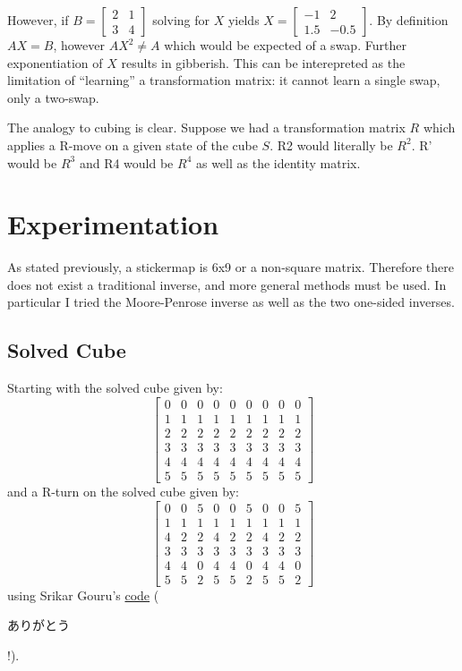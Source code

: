 \documentclass[11pt, oneside]{article}
\begin{document}
However, if \( B = \begin{bmatrix} 2 & 1 \\ 3 & 4 \end{bmatrix} \) solving for \( X \) yields \( X = \begin{bmatrix} -1 & 2 \\ 1.5 & -0.5 \end{bmatrix} \).
By definition \( A X = B \), however \( A X^2 \neq A \) which would be expected of a swap. Further exponentiation of \( X \) results in gibberish.
This can be interepreted as the limitation of ``learning'' a transformation matrix: it cannot learn a single swap, only a two-swap.

The analogy to cubing is clear. Suppose we had a transformation matrix \( R \) which applies a R-move on a given state of the cube \( S \). R2 would literally be \( R^2 \).
R' would be \( R^3 \) and R4 would be \( R^4 \) as well as the identity matrix.

\section{Experimentation}

As stated previously, a stickermap is 6x9 or a non-square matrix. Therefore there does not exist a traditional inverse, and more general methods must be used. In particular I tried
the Moore-Penrose inverse as well as the two one-sided inverses.

\subsection{Solved Cube}
Starting with the solved cube given by:
\[ \begin{bmatrix} 0 & 0 & 0 & 0 & 0 & 0 & 0 & 0 & 0 \\ 1 & 1 & 1 & 1 & 1 & 1 & 1 & 1 & 1 \\ 2 & 2 & 2 & 2 & 2 & 2 & 2 & 2 & 2 \\ 3 & 3 & 3 & 3 & 3 & 3 & 3 & 3 & 3 \\ 4 & 4 & 4 & 4 &
4 & 4 & 4 & 4 & 4 \\ 5 & 5 & 5 & 5 & 5 & 5 & 5 & 5 & 5 \end{bmatrix} \]
and a R-turn on the solved cube given by:
\[ \begin{bmatrix} 0 & 0 & 5 & 0 & 0 & 5 & 0 & 0 & 5 \\1 & 1 & 1 & 1 & 1 & 1 & 1 & 1 & 1 \\4 & 2 & 2 & 4 & 2 & 2 & 4 & 2 & 2 \\3 & 3 & 3 & 3 & 3 & 3 & 3 & 3 & 3 \\4 & 4 & 0 & 4 & 4 & 0 & 4 & 4 & 0 \\5 & 5 & 2 & 5 & 5 & 2 & 5 & 5 & 2 \end{bmatrix} \]
using Srikar Gouru's \href{https://github.com/srikarg89/RubiksCubeSolver-JS}{code} (\begin{CJK}{UTF8}{maru} ありがとう \end{CJK}!).
\end{document}
